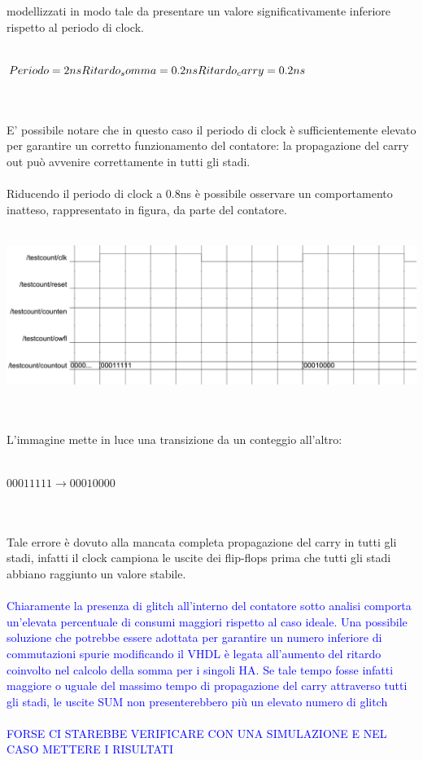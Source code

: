 \documentclass[11pt,  english, makeidx, a4paper, titlepage, oneside]{book}
\begin{document}
modellizzati in modo tale da presentare un valore significativamente
inferiore rispetto al periodo di clock.
\\\\
\centerline{$Periodo = 2ns \\
            Ritardo_somma = 0.2ns \\
            Ritardo_carry = 0.2ns $}
\\\\
E' possibile notare che in questo caso il periodo di clock è 
sufficientemente elevato per garantire un corretto funzionamento 
del contatore: la propagazione del carry out può avvenire correttamente
in tutti gli stadi.
\\\\
Riducendo il periodo di clock a 0.8ns è possibile osservare un
comportamento inatteso, rappresentato in figura, da parte del contatore.
\\\\
\centerline{\includegraphics[width=15cm]{./img/Lab_1/Es_5/Clk_corto.png}}
\\\\
L'immagine mette in luce una transizione da un conteggio all'altro:
\\\\
\centerline{$00011111 \rightarrow 00010000$}
\\\\
Tale errore è dovuto alla mancata completa propagazione del carry in tutti
gli stadi, infatti il clock campiona le uscite dei flip-flops prima che tutti
gli stadi abbiano raggiunto un valore stabile. 
\\\\
\textcolor{blue}{Chiaramente la presenza di glitch all'interno del contatore sotto analisi comporta
un'elevata percentuale di consumi maggiori rispetto al caso ideale. Una possibile soluzione che potrebbe
essere adottata per garantire un numero inferiore di commutazioni spurie modificando il VHDL è legata
all'aumento del ritardo coinvolto nel calcolo della somma per i singoli HA. 
Se tale tempo fosse infatti maggiore o uguale del massimo tempo di propagazione 
del carry attraverso tutti gli stadi, le uscite SUM non presenterebbero più un elevato numero di glitch
\\\\
FORSE CI STAREBBE VERIFICARE CON UNA SIMULAZIONE E NEL CASO METTERE I RISULTATI}
\end{document}

